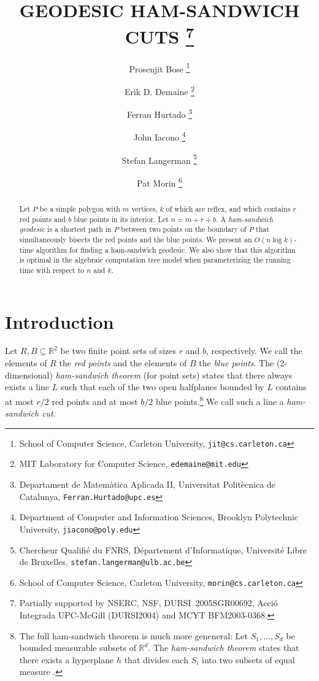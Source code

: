 \documentclass[charterfonts,lotsofwhite]{patmorin}
\newcommand{\email}[1]{\texttt{#1}}
\begin{document}
\title{\MakeUppercase{Geodesic Ham-Sandwich Cuts}%
  \thanks{Partially supported by  NSERC, NSF, DURSI~2005SGR00692, Acció Integrada
UPC-McGill (DURSI2004) and MCYT BFM2003-0368.}}
\author{Prosenjit Bose%
	\thanks{School of Computer Science, Carleton University,
		\email{jit@cs.carleton.ca}}
   \and Erik D. Demaine%
	\thanks{MIT Laboratory for Computer Science, 
		\email{edemaine@mit.edu}}
   \and Ferran Hurtado%
	\thanks{Departament de Matem\`atica Aplicada II, 
		Universitat Polit\`ecnica de Catalunya, 
		\email{Ferran.Hurtado@upc.es}}
   \and John Iacono%
        \thanks{Department of Computer and Information Sciences,
		Brooklyn Polytechnic University,
		\email{jiacono@poly.edu}}
   \and Stefan Langerman%
	\thanks{Chercheur Qualifi\'e du FNRS, 
		D\'epartement d'Informatique,
		Universit\'e Libre de Bruxelles,
		\email{stefan.langerman@ulb.ac.be}}
   \and Pat Morin%
        \thanks{School of Computer Science, Carleton University,
		\email{morin@cs.carleton.ca}}
}
\date{}
\maketitle

\begin{abstract} Let $P$ be a simple polygon with $m$ vertices, $k$ of
which are reflex, and which contains $r$ red points and $b$ blue
points in its interior.  Let $n=m+r+b$. A \emph{ham-sandwich geodesic}
is a shortest path in $P$ between two points on the boundary of $P$
that simultaneously bisects the red points and the blue points.  We
present an $O(n \log k)$-time algorithm for finding a ham-sandwich
geodesic.  We also show that this algorithm is optimal in the
algebraic computation tree model when parameterizing the running time
with respect to $n$ and $k$.  \end{abstract}


\section{Introduction}

Let $R,B\subseteq \mathbb{R}^2$ be two finite point sets of sizes $r$
and $b$, respectively.  We call the elements of $R$ the \emph{red
points} and the elements of $B$ the \emph{blue points}.  The
(2-dimensional) \emph{ham-sandwich theorem} (for point sets) states
that there always exists a line $L$ such that each of the two open
halfplanes bounded by $L$ contains at most $r/2$ red points and at
most $b/2$ blue points.\footnote{The full ham-sandwich theorem is much
more geneneral:  Let $S_1,\ldots,S_d$ be bounded measurable subsets of
$\mathbb{R}^d$.  The \emph{ham-sandwich theorem} states that there
exists a hyperplane $h$ that divides each $S_i$ into two subsets of
equal measure \cite{st42}.}  We call such a line a \emph{ham-sandwich
cut}.
\end{document}

